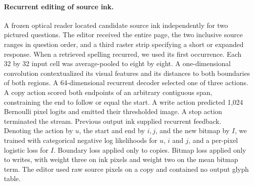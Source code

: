 \documentclass[12pt,a4paper]{article}
\providecommand{\DIFadd}[1]{{\protect\color{blue} \sf #1}} %
\begin{document}
\paragraph{\DIFadd{Recurrent editing of source ink.}}
\DIFadd{A frozen optical reader located candidate source ink independently for two pictured questions. The editor received the entire page, the two inclusive source ranges in question order, and a third raster strip specifying a short or expanded response. When a retrieved spelling recurred, we used its first occurrence. Each 32 by 32 input cell was average-pooled to eight by eight. A one-dimensional convolution contextualized its visual features and its distances to both boundaries of both regions. A 64-dimensional recurrent decoder selected one of three actions. A copy action scored both endpoints of an arbitrary contiguous span, constraining the end to follow or equal the start. A write action predicted 1,024 Bernoulli pixel logits and emitted their thresholded image. A stop action terminated the stream. Previous output ink supplied recurrent feedback. Denoting the action by $u$, the start and end by $i,j$, and the new bitmap by $I$, we trained with categorical negative log likelihoods for $u$, $i$ and $j$, and a per-pixel logistic loss for $I$. Boundary loss applied only to copies. Bitmap loss applied only to writes, with weight three on ink pixels and weight two on the mean bitmap term. The editor used raw source pixels on a copy and contained no output glyph table.
}
\end{document}
